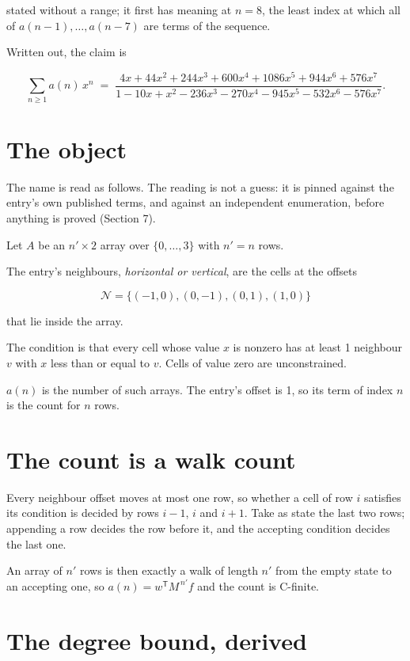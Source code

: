 \documentclass[11pt]{article}
\theoremstyle{definition}
\begin{document}
stated without a range; it first has meaning at $n = 8$, the least index at which all of $a(n-1),\dots,a(n-7)$ are terms of the sequence.

Written out, the claim is

\[\sum_{n \ge 1} a(n)\,x^n \;=\; \frac{4x + 44x^{2} + 244x^{3} + 600x^{4} + 1086x^{5} + 944x^{6} + 576x^{7}}{1 - 10x + x^{2} - 236x^{3} - 270x^{4} - 945x^{5} - 532x^{6} - 576x^{7}}.\]

\section{The object}

The name is read as follows. The reading is not a guess: it is pinned against the entry's own published terms, and against an independent enumeration, before anything is proved (Section 7).

Let $A$ be an $n' \times 2$ array over $\{0,\dots,3\}$ with $n' = n$ rows.

The entry's neighbours, {\itshape horizontal or vertical}, are the cells at the offsets

\[\mathcal{N} = \{(-1,0), (0,-1), (0,1), (1,0)\}\]

that lie inside the array.

The condition is that every cell whose value $x$ is nonzero has at least 1 neighbour $v$ with $x$ less than or equal to $v$. Cells of value zero are unconstrained.

$a(n)$ is the number of such arrays. The entry's offset is 1, so its term of index $n$ is the count for $n$ rows.

\section{The count is a walk count}

Every neighbour offset moves at most one row, so whether a cell of row $i$ satisfies its condition is decided by rows $i-1$, $i$ and $i+1$. Take as state the last two rows; appending a row decides the row before it, and the accepting condition decides the last one.

An array of $n'$ rows is then exactly a walk of length $n'$ from the empty state to an accepting one, so $a(n) = w^{\mathsf T}M^{\,n'}f$ and the count is C-finite.

\section{The degree bound, derived}
\end{document}
